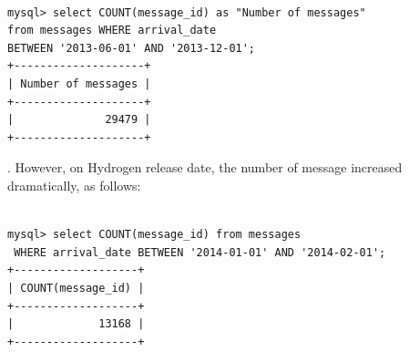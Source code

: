 \documentclass[a4paper, 12pt]{book}
\begin{document}
\begin{verbatim}

mysql> select COUNT(message_id) as "Number of messages"
from messages WHERE arrival_date
BETWEEN '2013-06-01' AND '2013-12-01';
+--------------------+
| Number of messages |
+--------------------+
|              29479 |
+--------------------+

\end{verbatim}
. However, on Hydrogen release date, the number of message increased dramatically, as follows:

\begin{verbatim}

mysql> select COUNT(message_id) from messages
 WHERE arrival_date BETWEEN '2014-01-01' AND '2014-02-01';
+-------------------+
| COUNT(message_id) |
+-------------------+
|             13168 |
+-------------------+

\end{verbatim}
\end{document}
